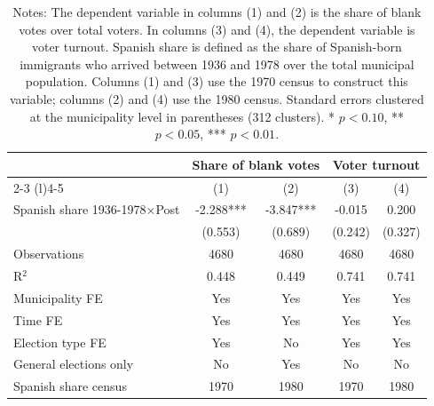 \begin{table}[!h]
\caption{Effects on Blank Votes and Voter Turnout}
\renewcommand{\arraystretch}{1.25}
\setlength{\tabcolsep}{6pt}
\centering
\begin{tabular}[t]{lcccc}
\hline
 & \multicolumn{2}{c}{Share of blank votes} & \multicolumn{2}{c}{Voter turnout} \\
\cmidrule(l){2-3} \cmidrule(l){4-5}
  & (1) & (2) & (3) & (4)\\
\hline
Spanish share 1936-1978$\times$Post & -2.288*** & -3.847*** & -0.015 & 0.200\\
 & (0.553) & (0.689) & (0.242) & (0.327)\\

\addlinespace
Observations & 4680 & 4680 & 4680 & 4680\\
R$^2$ & 0.448 & 0.449 & 0.741 & 0.741\\
Municipality FE & Yes & Yes & Yes & Yes\\
Time FE & Yes & Yes & Yes & Yes\\
Election type FE & Yes & No & Yes & Yes\\
General elections only & No & Yes & No & No\\
Spanish share census & 1970 & 1980 & 1970 & 1980\\
\hline
\end{tabular}
\vspace{0.3em}
\captionsetup{font=footnotesize, justification=justified, singlelinecheck=false}
\caption*{\footnotesize Notes: The dependent variable in columns (1) and (2) is the share of blank votes over total voters. In columns (3) and (4), the dependent variable is voter turnout. Spanish share is defined as the share of Spanish-born immigrants who arrived between 1936 and 1978 over the total municipal population. Columns (1) and (3) use the 1970 census to construct this variable; columns (2) and (4) use the 1980 census. Standard errors clustered at the municipality level in parentheses (312 clusters). * $p<0.10$, ** $p<0.05$, *** $p<0.01$.}
\end{table}
